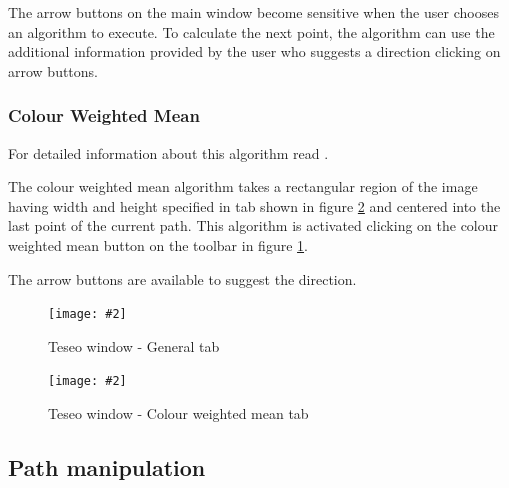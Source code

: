\documentclass[a4paper,11pt]{article}
\newcommand{\teseoscalegraphics}[0]{1}
\newcommand{\teseoincludegraphics}[2]{ \texttt{[image: \#2]} }
\begin{document}
The arrow buttons on the main window become sensitive when the user chooses an algorithm to execute.
To calculate the next point, the algorithm can use the additional information provided by the user who suggests a direction clicking on arrow buttons.


\subsubsection{Colour Weighted Mean}
\label{sec:cwm}

For detailed information about this algorithm read \cite{pintore}.

The colour weighted mean algorithm takes a rectangular region of the image having width and height specified in tab shown in figure \ref{fig:teseocwm} and centered into the last point of the current path.
This algorithm is activated clicking on the colour weighted mean button on the toolbar in figure \ref{fig:teseogeneral}.

The arrow buttons are available to suggest the direction.


\begin{figure}[!ht]
\begin{center}
\teseoincludegraphics{\teseoscalegraphics}{images/snapshot6.png}
\caption{Teseo window - General tab}
\label{fig:teseogeneral}
\end{center}
\end{figure}

\begin{figure}[!ht]
\begin{center}
\teseoincludegraphics{\teseoscalegraphics}{images/snapshot7.png}
\caption{Teseo window - Colour weighted mean tab}
\label{fig:teseocwm}
\end{center}
\end{figure}


\subsection{Path manipulation}
\end{document}
